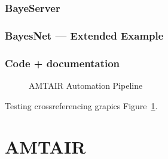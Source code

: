 \documentclass[
  letterpaper,
]{book}
\begin{document}
\subsection{BayeServer}\label{bayeserver}

\subsection{BayesNet --- Extended
Example}\label{bayesnet-extended-example}

\subsection{Code + documentation}\label{code-documentation}

\begin{figure}


\caption[Five-step AMTAIR automation pipeline from PDFs to Bayesian
networks]{\label{fig-automation_pipeline}AMTAIR Automation Pipeline}

\end{figure}%

Testing crossreferencing grapics Figure~\ref{fig-automation_pipeline}.


\chapter{AMTAIR}\label{amtair}
\end{document}
